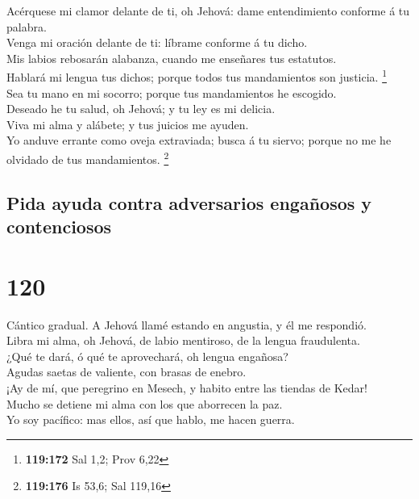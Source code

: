  Acérquese mi clamor delante de ti, oh Jehová: dame
entendimiento conforme á tu palabra.\\
 Venga mi oración delante de ti: líbrame conforme á tu
dicho.\\
 Mis labios rebosarán alabanza, cuando me enseñares tus
estatutos.\\
 Hablará mi lengua tus dichos; porque todos tus
mandamientos son justicia. \footnote{\textbf{119:172} Sal 1,2; Prov 6,22}\\
 Sea tu mano en mi socorro; porque tus mandamientos he
escogido.\\
 Deseado he tu salud, oh Jehová; y tu ley es mi delicia.\\
 Viva mi alma y alábete; y tus juicios me ayuden.\\
 Yo anduve errante como oveja extraviada; busca á tu
siervo; porque no me he olvidado de tus mandamientos. \footnote{\textbf{119:176}
  Is 53,6; Sal 119,16}

\hypertarget{pida-ayuda-contra-adversarios-engauxf1osos-y-contenciosos}{%
\subsection{Pida ayuda contra adversarios engañosos y
contenciosos}\label{pida-ayuda-contra-adversarios-engauxf1osos-y-contenciosos}}

\hypertarget{section-119}{%
\section{120}\label{section-119}}

 Cántico gradual. A Jehová llamé estando en angustia, y él
me respondió.\\
 Libra mi alma, oh Jehová, de labio mentiroso, de la lengua
fraudulenta.\\
 ¿Qué te dará, ó qué te aprovechará, oh lengua engañosa?\\
 Agudas saetas de valiente, con brasas de enebro.\\
 ¡Ay de mí, que peregrino en Mesech, y habito entre las
tiendas de Kedar!\\
 Mucho se detiene mi alma con los que aborrecen la paz.\\
 Yo soy pacífico: mas ellos, así que hablo, me hacen guerra.


